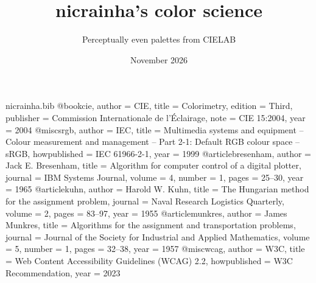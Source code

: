 \begin{filecontents*}[overwrite]{nicrainha.bib}
@book{cie,
  author = {{CIE}}, title = {Colorimetry}, edition = {Third},
  publisher = {Commission Internationale de l'\'Eclairage},
  note = {CIE 15:2004}, year = {2004}}
@misc{srgb,
  author = {{IEC}}, title = {Multimedia systems and equipment -- Colour
  measurement and management -- Part 2-1: Default {RGB} colour space -- {sRGB}},
  howpublished = {IEC 61966-2-1}, year = {1999}}
@article{bresenham,
  author = {Jack E. Bresenham}, title = {Algorithm for computer control of a
  digital plotter}, journal = {IBM Systems Journal}, volume = {4}, number = {1},
  pages = {25--30}, year = {1965}}
@article{kuhn,
  author = {Harold W. Kuhn}, title = {The {H}ungarian method for the assignment
  problem}, journal = {Naval Research Logistics Quarterly}, volume = {2},
  pages = {83--97}, year = {1955}}
@article{munkres,
  author = {James Munkres}, title = {Algorithms for the assignment and
  transportation problems}, journal = {Journal of the Society for Industrial
  and Applied Mathematics}, volume = {5}, number = {1}, pages = {32--38},
  year = {1957}}
@misc{wcag,
  author = {{W3C}}, title = {Web Content Accessibility Guidelines ({WCAG}) 2.2},
  howpublished = {W3C Recommendation}, year = {2023}}
\end{filecontents*}
\documentclass{nicrainha}
\usepackage{tikz}
\usetikzlibrary{arrows.meta}

\title{nicrainha's color science}
\author{Perceptually even palettes from CIELAB}
\date{November 2026}


\maketitle

\begin{slide}{One lightness}
  A nicrainha palette is a set of colors that differ only in hue.
  \begin{itemize}
    \item Every color has the same CIELAB lightness $L^*$ \cite{cie}.
    \item The same $L^*$ means the same relative luminance:
      \[ Y = \left(\right)^{3} \qquad (L^* > 8). \]
    \item So every color has the same contrast with any gray, black and
      white included.
    \item No color shouts: the palette is even to the eye.
  \end{itemize}
\end{slide}


